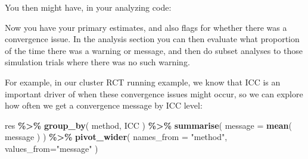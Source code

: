 \documentclass[
]{book}
\newenvironment{Shaded}{\begin{snugshade}}{\end{snugshade}}
\newcommand{\AttributeTok}[1]{\textcolor[rgb]{0.13,0.29,0.53}{#1}}
\newcommand{\CommentTok}[1]{\textcolor[rgb]{0.56,0.35,0.01}{\textit{#1}}}
\newcommand{\ControlFlowTok}[1]{\textcolor[rgb]{0.13,0.29,0.53}{\textbf{#1}}}
\newcommand{\DecValTok}[1]{\textcolor[rgb]{0.00,0.00,0.81}{#1}}
\newcommand{\FunctionTok}[1]{\textcolor[rgb]{0.13,0.29,0.53}{\textbf{#1}}}
\newcommand{\NormalTok}[1]{#1}
\newcommand{\OtherTok}[1]{\textcolor[rgb]{0.56,0.35,0.01}{#1}}
\newcommand{\SpecialCharTok}[1]{\textcolor[rgb]{0.81,0.36,0.00}{\textbf{#1}}}
\newcommand{\StringTok}[1]{\textcolor[rgb]{0.31,0.60,0.02}{#1}}
\begin{document}
You then might have, in your analyzing code:

\begin{Shaded}
\end{Shaded}

Now you have your primary estimates, and also flags for whether there was a convergence issue.
In the analysis section you can then evaluate what proportion of the time there was a warning or message, and then do subset analyses to those simulation trials where there was no such warning.

For example, in our cluster RCT running example, we know that ICC is an important driver of when these convergence issues might occur, so we can explore how often we get a convergence message by ICC level:

\begin{Shaded}
\begin{Highlighting}[]
\NormalTok{res }\SpecialCharTok{\%\textgreater{}\%} 
  \FunctionTok{group\_by}\NormalTok{( method, ICC ) }\SpecialCharTok{\%\textgreater{}\%}
  \FunctionTok{summarise}\NormalTok{( }\AttributeTok{message =} \FunctionTok{mean}\NormalTok{( message ) ) }\SpecialCharTok{\%\textgreater{}\%}
  \FunctionTok{pivot\_wider}\NormalTok{( }\AttributeTok{names\_from =} \StringTok{"method"}\NormalTok{, }\AttributeTok{values\_from=}\StringTok{"message"}\NormalTok{ )}
\end{Highlighting}
\end{Shaded}
\end{document}
